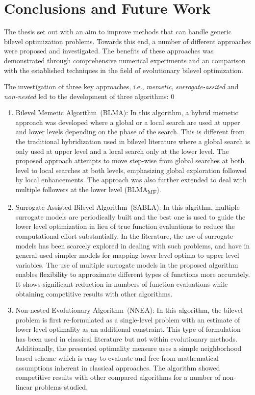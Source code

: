 \chapter{Conclusions and Future Work}
\label{chapter:6}


The thesis set out with an aim to improve methods that can handle generic bilevel optimization problems. Towards this end, a number of different approaches were proposed and investigated. The benefits of these approaches was demonstrated through comprehensive numerical experiments and an comparison with the established techniques in the field of evolutionary bilevel optimization. 

The investigation of three key approaches, i.e., \emph{memetic}, \emph{surrogate-assited} and \emph{non-nested} led to the development of three algorithms:
0
\begin{enumerate}
\item Bilevel Memetic Algorithm~(BLMA): In this algorithm, a hybrid memetic approach was developed where a global or a local search are used at upper and lower levels depending on the phase of the search. This is different from the traditional hybridization used in bilevel literature where a global search is only used at upper level and a local search only at the lower level. The proposed approach attempts to move step-wise from global searches at both level to local searches at both levels, emphasizing global exploration followed by local enhancements. The approach was also further extended to deal with multiple followers at the lower level (BLMA\textsubscript{MF}).
\item Surrogate-Assisted Bilevel Algorithm~(SABLA): In this algrithm, multiple surrogate models are periodically built and the best one is used to guide the lower level optimization in lieu of true function evaluations to reduce the computational effort substantially. In the literature, the use of surrogate models has been scarcely explored in dealing with such problems, and have in general used simpler models for mapping lower level optima to upper level variables. The use of multiple surrogate models in the proposed algorithm enables flexibility to approximate different types of functions more accurately. It shows significant reduction in numbers of function evaluations while obtaining competitive results with other algorithms.   
\item Non-nested Evolutionary Algorithm~(NNEA): In this algorithm, the bilevel problem is first re-formulated as a single-level problem with an estimate of lower level optimality as an additional constraint. This type of formulation has been used in classical literature but not within evolutionary methods. Additionally, the presented optimality measure uses a simple neighborhood based scheme which is easy to evaluate and free from mathematical assumptions inherent in classical approaches. The algorithm showed competitive results with other compared algorithms for a number of non-linear problems studied. 
\end{enumerate}

